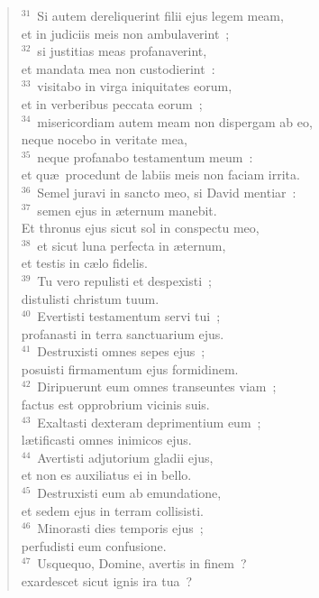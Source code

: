 \begin{verse}
${}^{31}$~Si autem dereliquerint filii ejus legem meam,\\ et in judiciis meis non ambulaverint~;\\
${}^{32}$~si justitias meas profanaverint,\\ et mandata mea non custodierint~:\\
${}^{33}$~visitabo in virga iniquitates eorum,\\ et in verberibus peccata eorum~;\\
${}^{34}$~misericordiam autem meam non dispergam ab eo,\\ neque nocebo in veritate mea,\\
${}^{35}$~neque profanabo testamentum meum~:\\ et qu\ae\ procedunt de labiis meis non faciam irrita.\\
${}^{36}$~Semel juravi in sancto meo, si David mentiar~:\\
${}^{37}$~semen ejus in \ae ternum manebit.\\ Et thronus ejus sicut sol in conspectu meo,\\
${}^{38}$~et sicut luna perfecta in \ae ternum,\\ et testis in c\ae lo fidelis.\\
${}^{39}$~Tu vero repulisti et despexisti~;\\ distulisti christum tuum.\\
${}^{40}$~Evertisti testamentum servi tui~;\\ profanasti in terra sanctuarium ejus.\\
${}^{41}$~Destruxisti omnes sepes ejus~;\\ posuisti firmamentum ejus formidinem.\\
${}^{42}$~Diripuerunt eum omnes transeuntes viam~;\\ factus est opprobrium vicinis suis.\\
${}^{43}$~Exaltasti dexteram deprimentium eum~;\\ l\ae tificasti omnes inimicos ejus.\\
${}^{44}$~Avertisti adjutorium gladii ejus,\\ et non es auxiliatus ei in bello.\\
${}^{45}$~Destruxisti eum ab emundatione,\\ et sedem ejus in terram collisisti.\\
${}^{46}$~Minorasti dies temporis ejus~;\\ perfudisti eum confusione.\\
${}^{47}$~Usquequo, Domine, avertis in finem~?\\ exardescet sicut ignis ira tua~?\\

\end{verse}
